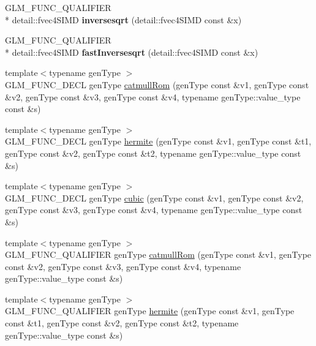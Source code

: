 \begin{DoxyCompactItemize}
\item 
\hypertarget{namespaceglm_ac3ad88ad132bb5179b928f3f57afc6b5}{G\-L\-M\-\_\-\-F\-U\-N\-C\-\_\-\-Q\-U\-A\-L\-I\-F\-I\-E\-R \\*
detail\-::fvec4\-S\-I\-M\-D {\bfseries inversesqrt} (detail\-::fvec4\-S\-I\-M\-D const \&x)}\label{namespaceglm_ac3ad88ad132bb5179b928f3f57afc6b5}

\item 
\hypertarget{namespaceglm_af499190525c6e1f524054b9b18b12444}{G\-L\-M\-\_\-\-F\-U\-N\-C\-\_\-\-Q\-U\-A\-L\-I\-F\-I\-E\-R \\*
detail\-::fvec4\-S\-I\-M\-D {\bfseries fast\-Inversesqrt} (detail\-::fvec4\-S\-I\-M\-D const \&x)}\label{namespaceglm_af499190525c6e1f524054b9b18b12444}

\item 
{\footnotesize template$<$typename gen\-Type $>$ }\\G\-L\-M\-\_\-\-F\-U\-N\-C\-\_\-\-D\-E\-C\-L gen\-Type \hyperlink{group__gtx__spline_ga8119c04f8210fd0d292757565cd6918d}{catmull\-Rom} (gen\-Type const \&v1, gen\-Type const \&v2, gen\-Type const \&v3, gen\-Type const \&v4, typename gen\-Type\-::value\-\_\-type const \&s)
\item 
{\footnotesize template$<$typename gen\-Type $>$ }\\G\-L\-M\-\_\-\-F\-U\-N\-C\-\_\-\-D\-E\-C\-L gen\-Type \hyperlink{group__gtx__spline_gaa69e143f6374d32f934a8edeaa50bac9}{hermite} (gen\-Type const \&v1, gen\-Type const \&t1, gen\-Type const \&v2, gen\-Type const \&t2, typename gen\-Type\-::value\-\_\-type const \&s)
\item 
{\footnotesize template$<$typename gen\-Type $>$ }\\G\-L\-M\-\_\-\-F\-U\-N\-C\-\_\-\-D\-E\-C\-L gen\-Type \hyperlink{group__gtx__spline_ga6b867eb52e2fc933d2e0bf26aabc9a70}{cubic} (gen\-Type const \&v1, gen\-Type const \&v2, gen\-Type const \&v3, gen\-Type const \&v4, typename gen\-Type\-::value\-\_\-type const \&s)
\item 
{\footnotesize template$<$typename gen\-Type $>$ }\\G\-L\-M\-\_\-\-F\-U\-N\-C\-\_\-\-Q\-U\-A\-L\-I\-F\-I\-E\-R gen\-Type \hyperlink{group__gtx__spline_ga8119c04f8210fd0d292757565cd6918d}{catmull\-Rom} (gen\-Type const \&v1, gen\-Type const \&v2, gen\-Type const \&v3, gen\-Type const \&v4, typename gen\-Type\-::value\-\_\-type const \&s)
\item 
{\footnotesize template$<$typename gen\-Type $>$ }\\G\-L\-M\-\_\-\-F\-U\-N\-C\-\_\-\-Q\-U\-A\-L\-I\-F\-I\-E\-R gen\-Type \hyperlink{group__gtx__spline_gaa69e143f6374d32f934a8edeaa50bac9}{hermite} (gen\-Type const \&v1, gen\-Type const \&t1, gen\-Type const \&v2, gen\-Type const \&t2, typename gen\-Type\-::value\-\_\-type const \&s)

\end{DoxyCompactItemize}
